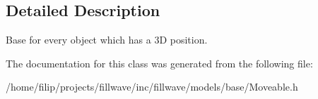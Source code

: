 \subsection{Detailed Description}
Base for every object which has a 3D position. 

The documentation for this class was generated from the following file\+:\begin{DoxyCompactItemize}
\item 
/home/filip/projects/fillwave/inc/fillwave/models/base/Moveable.\+h\end{DoxyCompactItemize}
